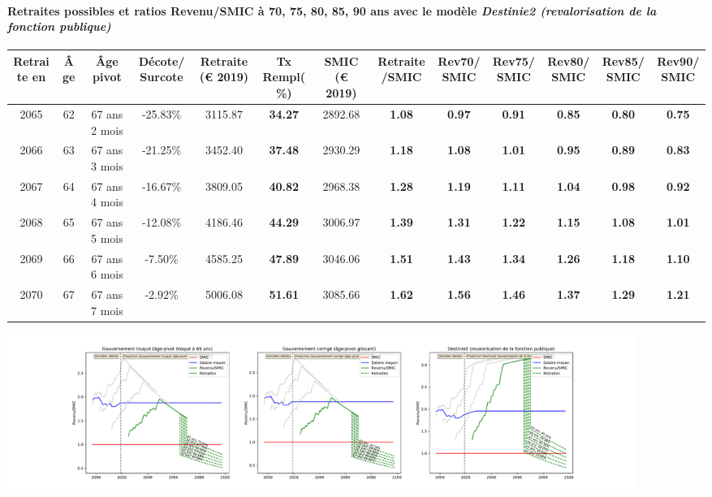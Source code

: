 \paragraph{Retraites possibles et ratios Revenu/SMIC à 70, 75, 80, 85, 90 ans avec le modèle \emph{Destinie2 (revalorisation de la fonction publique)}}  
 
{ \scriptsize \begin{center} 
\begin{tabular}[htb]{|c|c||c|c||c|c||c||c|c|c|c|c|c|} 
\hline 
 Retraite en &  Âge &  Âge pivot &  Décote/Surcote &  Retraite (\euro{} 2019) &  Tx Rempl(\%) &  SMIC (\euro{} 2019) &  Retraite/SMIC &  Rev70/SMIC &  Rev75/SMIC &  Rev80/SMIC &  Rev85/SMIC &  Rev90/SMIC \\ 
\hline \hline 
 2065 &  62 &  67 ans 2 mois &  -25.83\% &  3115.87 &  {\bf 34.27} &  2892.68 &  {\bf 1.08} &  {\bf {\color{red} 0.97}} &  {\bf {\color{red} 0.91}} &  {\bf {\color{red} 0.85}} &  {\bf {\color{red} 0.80}} &  {\bf {\color{red} 0.75}} \\ 
\hline 
 2066 &  63 &  67 ans 3 mois &  -21.25\% &  3452.40 &  {\bf 37.48} &  2930.29 &  {\bf 1.18} &  {\bf 1.08} &  {\bf 1.01} &  {\bf {\color{red} 0.95}} &  {\bf {\color{red} 0.89}} &  {\bf {\color{red} 0.83}} \\ 
\hline 
 2067 &  64 &  67 ans 4 mois &  -16.67\% &  3809.05 &  {\bf 40.82} &  2968.38 &  {\bf 1.28} &  {\bf 1.19} &  {\bf 1.11} &  {\bf 1.04} &  {\bf {\color{red} 0.98}} &  {\bf {\color{red} 0.92}} \\ 
\hline 
 2068 &  65 &  67 ans 5 mois &  -12.08\% &  4186.46 &  {\bf 44.29} &  3006.97 &  {\bf 1.39} &  {\bf 1.31} &  {\bf 1.22} &  {\bf 1.15} &  {\bf 1.08} &  {\bf 1.01} \\ 
\hline 
 2069 &  66 &  67 ans 6 mois &  -7.50\% &  4585.25 &  {\bf 47.89} &  3046.06 &  {\bf 1.51} &  {\bf 1.43} &  {\bf 1.34} &  {\bf 1.26} &  {\bf 1.18} &  {\bf 1.10} \\ 
\hline 
 2070 &  67 &  67 ans 7 mois &  -2.92\% &  5006.08 &  {\bf 51.61} &  3085.66 &  {\bf 1.62} &  {\bf 1.56} &  {\bf 1.46} &  {\bf 1.37} &  {\bf 1.29} &  {\bf 1.21} \\ 
\hline 
\hline 
\end{tabular} 
\end{center} } 

 \begin{center}\includegraphics[width=0.9\textwidth]{fig/ProfAgrege_2003_22_dest_retraite.pdf}\end{center} \label{fig/ProfAgrege_2003_22_dest_retraite.pdf} 

